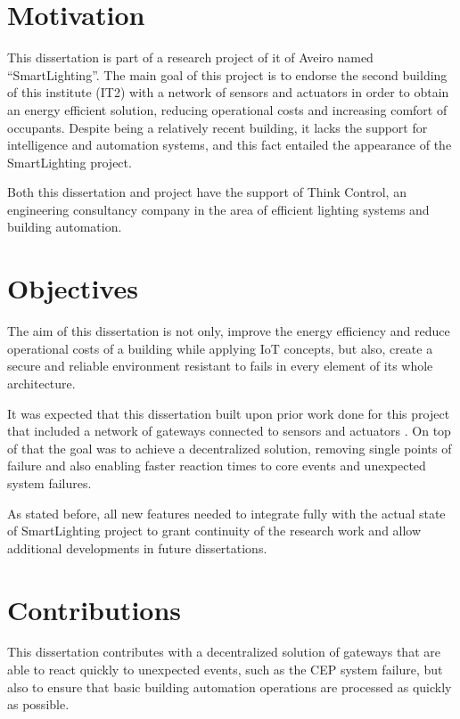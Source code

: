 \section{Motivation}

This dissertation is part of a research project of \acf{it} of Aveiro named ``SmartLighting''. The main goal of this project is to endorse the second building of this institute (IT2) with a network of sensors and actuators in order to obtain an energy efficient solution, reducing operational costs and increasing comfort of occupants. Despite being a relatively recent building, it lacks the support for intelligence and automation systems, and this fact entailed the appearance of the SmartLighting project.

Both this dissertation and project have the support of Think Control, an engineering consultancy company in the area of efficient lighting systems and building automation.


\section{Objectives}

The aim of this dissertation is not only, improve the energy efficiency and reduce operational costs of a building while applying IoT concepts, but also, create a secure and reliable environment resistant to fails in every element of its whole architecture.

It was expected that this dissertation built upon prior work done for this project that included a network of gateways connected to sensors and actuators \cite{helder}. On top of that the goal was to achieve a decentralized solution, removing single points of failure and also enabling faster reaction times to core events and unexpected system failures.

As stated before, all new features needed to integrate fully with the actual state of SmartLighting project to grant continuity of the research work and allow additional developments in future dissertations.


\section{Contributions}

This dissertation contributes with a decentralized solution of gateways that are able to react quickly to unexpected events, such as the CEP system failure, but also to ensure that basic building automation operations are processed as quickly as possible.

